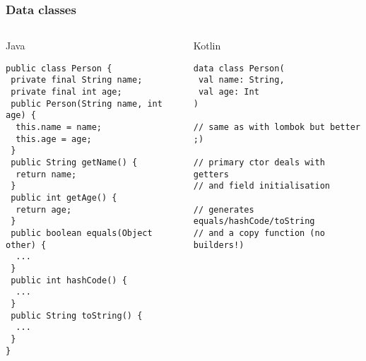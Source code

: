 
\begin{frame}[fragile]
\frametitle{Data classes}
\begin{columns}[t]
\begin{column}{0.5\textwidth}
\begin{center}
  Java
\end{center}
\begin{lstlisting}[style=twosided]
public class Person {
 private final String name;
 private final int age;
 public Person(String name, int age) {
  this.name = name;
  this.age = age;
 }
 public String getName() {
  return name;
 }
 public int getAge() {
  return age;
 }
 public boolean equals(Object other) {
  ...
 }
 public int hashCode() {
  ...
 }
 public String toString() {
  ...
 }
}
\end{lstlisting}

\end{column}
\begin{column}{0.5\textwidth}
\begin{center}
  Kotlin
\end{center}
\begin{lstlisting}[style=twosided]
data class Person(
 val name: String,
 val age: Int
)

// same as with lombok but better ;)

// primary ctor deals with getters
// and field initialisation

// generates equals/hashCode/toString
// and a copy function (no builders!)
\end{lstlisting}
\end{column}
\end{columns}
\end{frame}





